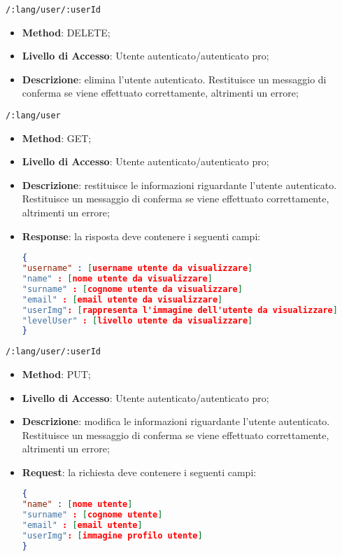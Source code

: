 \item \texttt{/:lang/user/:userId}
	\begin{itemize}
		\item \textbf{Method}: DELETE;
		\item \textbf{Livello di Accesso}: Utente autenticato/autenticato pro;
		\item \textbf{Descrizione}: elimina l'utente autenticato. Restituisce un messaggio di conferma se viene effettuato correttamente, altrimenti un errore;
	\end{itemize}	
	
	\item \texttt{/:lang/user}
		\begin{itemize}
			\item \textbf{Method}: GET;
			\item \textbf{Livello di Accesso}: Utente autenticato/autenticato pro;
			\item \textbf{Descrizione}: restituisce le informazioni riguardante l'utente autenticato. Restituisce un messaggio di conferma se viene effettuato correttamente, altrimenti un errore;
			\item \textbf{Response}: la risposta deve contenere i seguenti campi:
\begin{lstlisting}[language=json,firstnumber=1]
{
"username" : [username utente da visualizzare]
"name" : [nome utente da visualizzare]
"surname" : [cognome utente da visualizzare]
"email" : [email utente da visualizzare]
"userImg": [rappresenta l'immagine dell'utente da visualizzare]
"levelUser" : [livello utente da visualizzare]
}
\end{lstlisting}
		\end{itemize}
		
	\item \texttt{/:lang/user/:userId}
		\begin{itemize}
			\item \textbf{Method}: PUT;
			\item \textbf{Livello di Accesso}: Utente autenticato/autenticato pro;
			\item \textbf{Descrizione}: modifica le informazioni riguardante l'utente autenticato. Restituisce un messaggio di conferma se viene
effettuato correttamente, altrimenti un errore;
			\item \textbf{Request}: la richiesta deve contenere i seguenti campi:
\begin{lstlisting}[language=json,firstnumber=1]
{
"name" : [nome utente]
"surname" : [cognome utente]
"email" : [email utente]
"userImg": [immagine profilo utente]
}
\end{lstlisting}
		\end{itemize}	
		
